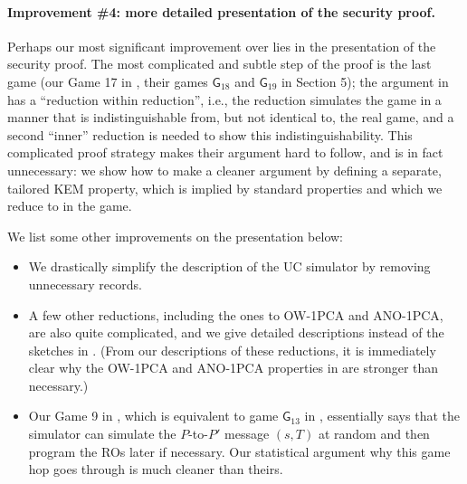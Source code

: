 \documentclass{article}
\theoremstyle{plain}
\theoremstyle{definition}
\theoremstyle{remark}
\begin{document}
\paragraph{Improvement \#4: more detailed presentation of the security proof.}
Perhaps our most significant improvement over \cite{EPRINT:ArrBarJar25} lies in the presentation of the security proof. The most complicated and subtle step of the proof is the last game (our Game 17 in , their games $\mathsf{G}_{18}$ and $\mathsf{G}_{19}$ in Section 5); the argument in \cite{EPRINT:ArrBarJar25} has a ``reduction within reduction'', i.e., the reduction simulates the game in a manner that is indistinguishable from, but not identical to, the real game, and a second ``inner'' reduction is needed to show this indistinguishability. This complicated proof strategy makes their argument hard to follow, and is in fact unnecessary: we show how to make a cleaner argument by defining a separate, tailored KEM property, which is implied by standard properties and which we reduce to in the game.

We list some other improvements on the presentation below:
\begin{itemize}
  \item We drastically simplify the description of the UC simulator by removing unnecessary records.
  \item A few other reductions, including the ones to OW-1PCA and ANO-1PCA, are also quite complicated, and we give detailed descriptions instead of the sketches in \cite{EPRINT:ArrBarJar25}. (From our descriptions of these reductions, it is immediately clear why the OW-1PCA and ANO-1PCA properties in \cite{EPRINT:ArrBarJar25} are stronger than necessary.)
  \item Our Game 9 in , which is equivalent to game $\mathsf{G}_{13}$ in \cite[Section~5]{EPRINT:ArrBarJar25}, essentially says that the simulator can simulate the $P$-to-$P'$ message $(s,T)$ at random and then program the ROs later if necessary. Our statistical argument why this game hop goes through is much cleaner than theirs.
\end{itemize}
\end{document}
